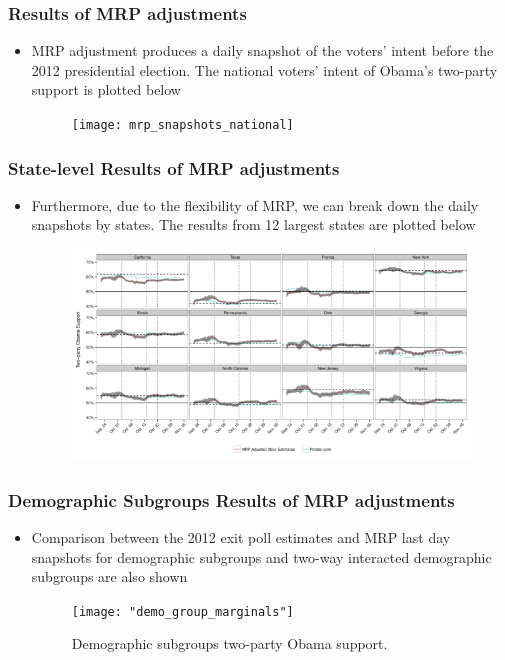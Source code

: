 \documentclass[xetex,mathserif,serif]{beamer}
\begin{document}
\begin{frame}
  \frametitle{Results of MRP adjustments}
  \begin{itemize}
  \item MRP adjustment produces a daily snapshot of the voters' intent before the
    2012 presidential election. The national voters' intent of Obama's two-party
    support is plotted below
    \begin{figure}[htbp]
      \centering
      \texttt{[image: mrp\_snapshots\_national]}
    \end{figure}
  \end{itemize}
\end{frame}

\begin{frame}
  \frametitle{State-level Results of MRP adjustments}
  \begin{itemize}
    \item Furthermore, due to the flexibility of MRP, we can break down the daily
      snapshots by states. The results from 12 largest states are plotted below
      \begin{figure}[htbp]
        \centering
        \includegraphics[width=.9\textwidth]{mrp_snapshots_state}
      \end{figure}
  \end{itemize}
\end{frame}

\begin{frame}
  \frametitle{Demographic Subgroups Results of MRP adjustments}
  \begin{itemize}
  \item Comparison between the 2012 exit poll estimates and MRP last day
    snapshots for demographic subgroups and two-way interacted demographic
    subgroups are also shown
    \begin{figure}[htbp]
      \centering
      \texttt{[image: "demo\_group\_marginals"]}
      \caption{Demographic subgroups two-party Obama support.}
    \end{figure}
  \end{itemize}
\end{frame}
\end{document}
